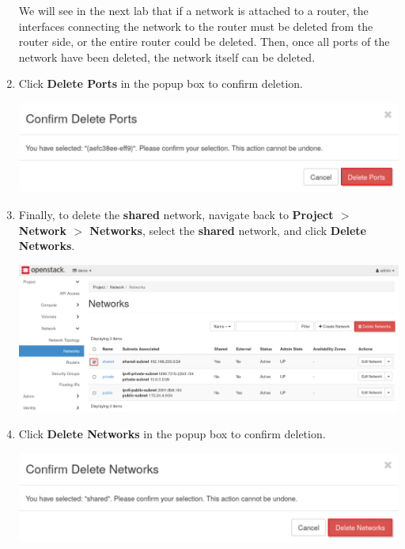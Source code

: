 \documentclass[letterpaper, 12pt]{article}
\begin{document}
\begin{enumerate}
    \begin{tipbox}
        We will see in the next lab that if a network is attached to a router, the interfaces connecting the network to
        the router must be deleted from the router side, or the entire router could be deleted. Then, once all ports of
        the network have been deleted, the network itself can be deleted.
    \end{tipbox}

    \item Click \textbf{Delete Ports} in the popup box to confirm deletion.

    \begin{center}
        \includegraphics[width=\linewidth]{images/part3/step4.png}
    \end{center}

    \item Finally, to delete the \textbf{shared} network, navigate back to \textbf{Project $>$ Network $>$ Networks},
    select the \textbf{shared} network, and click \textbf{Delete Networks}.

    \begin{center}
        \includegraphics[width=\linewidth]{images/part3/step5.png}
    \end{center}

    \item Click \textbf{Delete Networks} in the popup box to confirm deletion.

    \begin{center}
        \includegraphics[width=\linewidth]{images/part3/step6.png}
    \end{center}


\end{enumerate}
\end{document}
